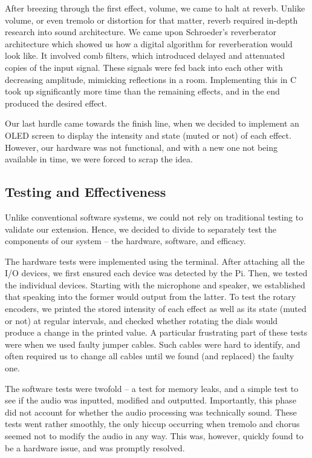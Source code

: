 \documentclass{article}
\begin{document}
After breezing through the first effect, volume, we came to halt at reverb. Unlike volume, or even tremolo or distortion for that matter, reverb required in-depth research into sound architecture. We came upon Schroeder’s reverberator architecture which showed us how a digital algorithm for reverberation would look like. It involved comb filters, which introduced delayed and attenuated copies of the input signal. These signals were fed back into each other with decreasing amplitude, mimicking reflections in a room. Implementing this in C took up significantly more time than the remaining effects, and in the end produced the desired effect.

Our last hurdle came towards the finish line, when we decided to implement an OLED screen to display the intensity and state (muted or not) of each effect. However, our hardware was not functional, and with a new one not being available in time, we were forced to scrap the idea.


\subsection{Testing and Effectiveness}

Unlike conventional software systems, we could not rely on traditional testing to validate our extension. Hence, we decided to divide to separately test the components of our system – the hardware, software, and efficacy. 

The hardware tests were implemented using the terminal. After attaching all the I/O devices, we first ensured each device was detected by the Pi. Then, we tested the individual devices. Starting with the microphone and speaker, we established that speaking into the former would output from the latter. To test the rotary encoders, we printed the stored intensity of each effect as well as its state (muted or not) at regular intervals, and checked whether rotating the dials would produce a change in the printed value. A particular frustrating part of these tests were when we used faulty jumper cables. Such cables were hard to identify, and often required us to change all cables until we found (and replaced) the faulty one.

The software tests were twofold – a test for memory leaks, and a simple test to see if the audio was inputted, modified and outputted. Importantly, this phase did not account for whether the audio processing was technically sound. These tests went rather smoothly, the only hiccup occurring when tremolo and chorus seemed not to modify the audio in any way. This was, however, quickly found to be a hardware issue, and was promptly resolved.
\end{document}
